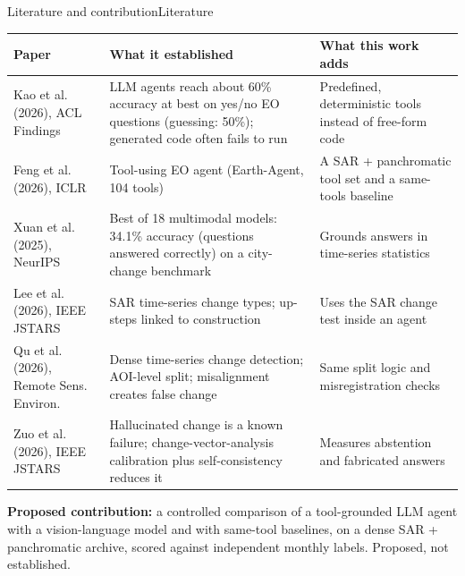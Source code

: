 \documentclass[aspectratio=169,11pt]{beamer}
\begin{document}
\begin{frame}[shrink=22]{Literature and contribution}{Literature}
\footnotesize
\begin{tabularx}{\textwidth}{@{}p{3.6cm}YY@{}}
\toprule
\textbf{Paper} & \textbf{What it established} & \textbf{What this work adds} \\
\midrule
Kao et al. (2026), ACL Findings & LLM agents reach about 60\% accuracy at best on yes/no EO questions (guessing: 50\%); generated code often fails to run & Predefined, deterministic tools instead of free-form code \\
Feng et al. (2026), ICLR & Tool-using EO agent (Earth-Agent, 104 tools) & A SAR + panchromatic tool set and a same-tools baseline \\
Xuan et al. (2025), NeurIPS & Best of 18 multimodal models: 34.1\% accuracy (questions answered correctly) on a city-change benchmark & Grounds answers in time-series statistics \\
Lee et al. (2026), IEEE JSTARS & SAR time-series change types; up-steps linked to construction & Uses the SAR change test inside an agent \\
Qu et al. (2026), Remote Sens. Environ. & Dense time-series change detection; AOI-level split; misalignment creates false change & Same split logic and misregistration checks \\
Zuo et al. (2026), IEEE JSTARS & Hallucinated change is a known failure; change-vector-analysis calibration plus self-consistency reduces it & Measures abstention and fabricated answers \\
\bottomrule
\end{tabularx}
\vspace{3pt}
{\footnotesize\textbf{Proposed contribution:} a controlled comparison of a tool-grounded LLM agent with a vision-language model and with same-tool baselines, on a dense SAR + panchromatic archive, scored against independent monthly labels. \alert{Proposed, not established.}}
\end{frame}
\end{document}
